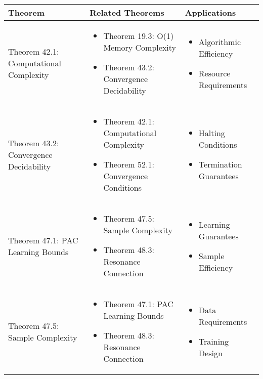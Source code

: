 \begin{table}[h]
\centering
\begin{tabular}{|l|p{7cm}|p{4cm}|}
\hline
\textbf{Theorem} & \textbf{Related Theorems} & \textbf{Applications} \\
\hline
Theorem 42.1: Computational Complexity &
\begin{itemize}
    \item Theorem 19.3: O(1) Memory Complexity
    \item Theorem 43.2: Convergence Decidability
\end{itemize} &
\begin{itemize}
    \item Algorithmic Efficiency
    \item Resource Requirements
\end{itemize} \\
\hline
Theorem 43.2: Convergence Decidability &
\begin{itemize}
    \item Theorem 42.1: Computational Complexity
    \item Theorem 52.1: Convergence Conditions
\end{itemize} &
\begin{itemize}
    \item Halting Conditions
    \item Termination Guarantees
\end{itemize} \\
\hline
Theorem 47.1: PAC Learning Bounds &
\begin{itemize}
    \item Theorem 47.5: Sample Complexity
    \item Theorem 48.3: Resonance Connection
\end{itemize} &
\begin{itemize}
    \item Learning Guarantees
    \item Sample Efficiency
\end{itemize} \\
\hline
Theorem 47.5: Sample Complexity &
\begin{itemize}
    \item Theorem 47.1: PAC Learning Bounds
    \item Theorem 48.3: Resonance Connection
\end{itemize} &
\begin{itemize}
    \item Data Requirements
    \item Training Design

\end{itemize}
\end{tabular}
\end{table}
